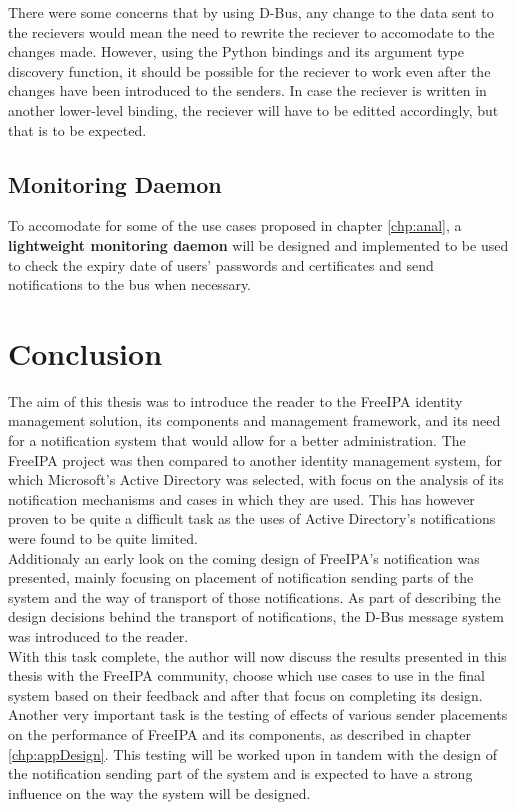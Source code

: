 There were some concerns that by using D-Bus, any change to the data sent to the recievers would mean the need to rewrite the reciever to accomodate to the changes made.
However, using the Python bindings and its argument type discovery function, it should be possible for the reciever to work even after the changes have been introduced to the senders.
In case the reciever is written in another lower-level binding, the reciever will have to be editted accordingly, but that is to be expected. \\

\section{Monitoring Daemon}
To accomodate for some of the use cases proposed in chapter \ref{chp:anal}, a \textbf{lightweight monitoring daemon} will be designed and implemented to be used to check the expiry date of users' passwords and certificates
and send notifications to the bus when necessary. \\


\chapter{Conclusion}
The aim of this thesis was to introduce the reader to the FreeIPA identity management solution, its components and management framework, and its need for a notification system that would allow for a better administration.
The FreeIPA project was then compared to another identity management system, for which Microsoft's Active Directory was selected, with focus on the analysis of its notification mechanisms and cases in which they are used.
This has however proven to be quite a difficult task as the uses of Active Directory's notifications were found to be quite limited.\\
Additionaly an early look on the coming design of FreeIPA's notification was presented, mainly focusing on placement of notification sending parts of the system and the way of transport of those notifications.
As part of describing the design decisions behind the transport of notifications, the D-Bus message system was introduced to the reader.\\
With this task complete, the author will now discuss the results presented in this thesis with the FreeIPA community, choose which use cases to use in the final system based on their feedback and after that focus on completing its design.\\
Another very important task is the testing of effects of various sender placements on the performance of FreeIPA and its components, as described in chapter \ref{chp:appDesign}.
This testing will be worked upon in tandem with the design of the notification sending part of the system and is expected to have a strong influence on the way the system will be designed.

